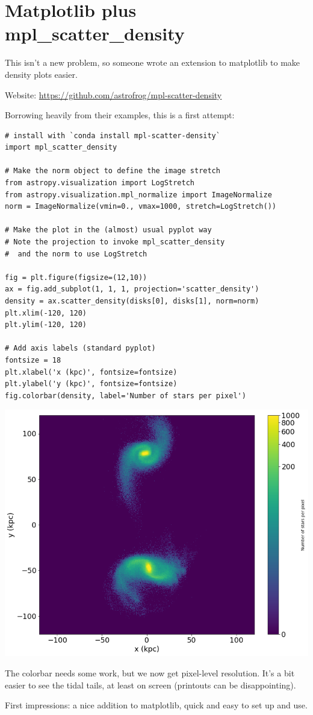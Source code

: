\section{Matplotlib plus mpl\_scatter\_density}

This isn't a new problem, so someone wrote an extension to matplotlib to make density plots easier.

Website: \url{https://github.com/astrofrog/mpl-scatter-density}

Borrowing heavily from their examples, this is a first attempt:


\lstset{style=py} 
\begin{lstlisting}
# install with `conda install mpl-scatter-density`
import mpl_scatter_density

# Make the norm object to define the image stretch
from astropy.visualization import LogStretch
from astropy.visualization.mpl_normalize import ImageNormalize
norm = ImageNormalize(vmin=0., vmax=1000, stretch=LogStretch())

# Make the plot in the (almost) usual pyplot way
# Note the projection to invoke mpl_scatter_density
#  and the norm to use LogStretch

fig = plt.figure(figsize=(12,10))
ax = fig.add_subplot(1, 1, 1, projection='scatter_density')
density = ax.scatter_density(disks[0], disks[1], norm=norm)
plt.xlim(-120, 120)
plt.ylim(-120, 120)

# Add axis labels (standard pyplot)
fontsize = 18
plt.xlabel('x (kpc)', fontsize=fontsize)
plt.ylabel('y (kpc)', fontsize=fontsize)
fig.colorbar(density, label='Number of stars per pixel')
\end{lstlisting}

{\centering \includegraphics[scale=0.55]{msg} \par}

The colorbar needs some work, but we now get pixel-level resolution. It's a bit easier to see the tidal tails, at least on screen (printouts can be disappointing).

First impressions: a nice addition to matplotlib, quick and easy to set up and use.


